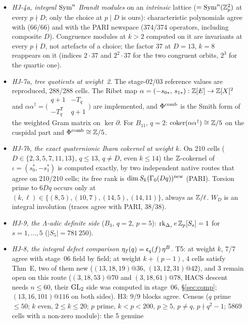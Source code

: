 \begin{itemize}
\item \emph{HJ-4a, integral $\mathrm{Sym}^n$ Brandt modules} on an \emph{intrinsic} lattice ($=\mathrm{Sym}^n(\mathbb{Z}_p^2)$ at every $p\nmid D$; only the choice at
  $p\mid D$ is ours): characteristic polynomials agree with  (66/66) and with the PARI newspace (374/374 operators,
  including composite $D$). Congruence modules at $k>2$ computed on it are invariants at every $p\nmid D$, not artefacts of a
  choice; the factor $37$ at $D=13$, $k=8$ reappears on it (indices $2\cdot37$ and $2^2\cdot37$ for the two congruent orbits, $2^3$ for the quartic one).
\item \emph{HJ-7a, tree quotients at weight~2.} The stage-02/03 reference values are reproduced, 288/288 cells. The Ribet map
  $\alpha=(-s_{0*},\,s_{1*}):\mathbb{Z}[E]\to\mathbb{Z}[X]^2$ and $\alpha\alpha^\dagger=\bigl(\begin{smallmatrix}q+1&-T_q\\-T_q^{\mathsf T}&q+1\end{smallmatrix}\bigr)$ are
  implemented, and $\Phi^{\mathrm{comb}}$ is the Smith form of the weighted Gram matrix on $\ker\partial$. For $B_{11}$, $q=2$:
  $\operatorname{coker}(\alpha\alpha^\dagger)\cong\mathbb{Z}/5$ on the cuspidal part and $\Phi^{\mathrm{comb}}\cong\mathbb{Z}/5$.
\item \emph{HJ-7b, the exact quaternionic Ihara cokernel at weight $k$.} On 210 cells ($D\in\{2,3,5,7,11,13\}$, $q\le13$, $q\ne D$,
  even $k\le14$) the $\mathbb{Z}$-cokernel of $\iota=(s_0^*,-s_1^*)$ is computed exactly, by two independent native routes that agree on
  210/210 cells; its free rank is $\dim S_k(\Gamma_0(Dq))^{\rm new}$ (PARI). Torsion prime to $6Dq$ occurs only at
  $(k,\ell)\in\{(8,5),(10,7),(14,5),(14,11)\}$, always as $\mathbb{Z}/\ell$. $W_D$ is an integral involution (traces agree with PARI, 38/38).
\item \emph{HJ-9, the $\Lambda$-adic definite side} ($B_3$, $q=2$, $p=5$): $\operatorname{rk}_{\Delta_s}e\,\mathbb{Z}_p[S_s]=1$ for $s=1,\dots,5$
  ($|S_5|=781\,250$).
\item \emph{HJ-8, the integral defect comparison $\eta_f(q)=\mathfrak{c}_q(f)\,\eta^B$.} T5: at weight $k$, 7/7 agree with stage~06 field by
  field; at weight $k+(p-1)$, 4 cells satisfy Thm~E, two of them new ($(13,18,19)@36$, $(13,12,31)@42$), and 3 remain open on this route
  ($(3,18,53)@70$ and $(3,18,61)@78$, HACS descent needs $n\le60$, their $\mathrm{GL}_2$ side was computed in stage~06, \S\ref{sec:comp}; $(13,16,101)@116$ on both sides). H3: 9/9 blocks agree. Census
  ($q$ prime $\le50$; $k$ even, $2\le k\le20$; $p$ prime, $k<p<200$, $p\ge5$, $p\ne q$, $p\nmid q^2-1$; 5869 cells with a non-zero module): the 5 genuine

\end{itemize}
